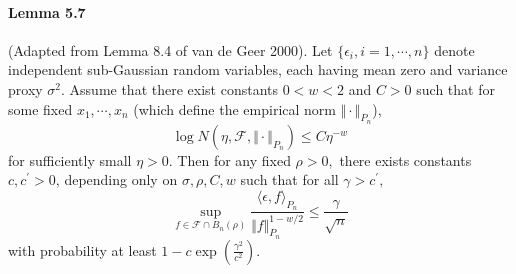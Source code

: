 \documentclass{article}
\begin{document}
\paragraph{Lemma 5.7} (Adapted from Lemma 8.4 of van de Geer 2000). Let $\{\epsilon_i,i=1,\cdots,n\}$ denote independent sub-Gaussian random variables, each having mean zero and variance proxy $\sigma^2$. Assume that there exist constants $0<w<2$ and $C>0$ such that for some fixed $x_1,\cdots, x_n$ (which define the empirical norm $\Vert\cdot\Vert_{P_n}$),\begin{equation*}
	\log N(\eta,\mathcal{F},\Vert\cdot\Vert_{P_n}) \leq C\eta^{-w}\tag{5.27}
\end{equation*}
for sufficiently small $\eta > 0.$ Then for any fixed $\rho >0,$ there exists constants $c,c^\prime > 0$, depending only on $\sigma,\rho,C,w$ such that for all $\gamma > c^\prime,$
\begin{equation*}
	\sup_{f\in\mathcal{F}\cap B_n(\rho)}\frac{\langle\epsilon,f\rangle_{P_n}}{\Vert f\Vert_{P_n}^{1-w/2}}\leq\frac{\gamma}{\sqrt{n}}\tag{5.28}
\end{equation*}
with probability at least $1-c\exp\left(\frac{\gamma^2}{c^2}\right).$
\end{document}
